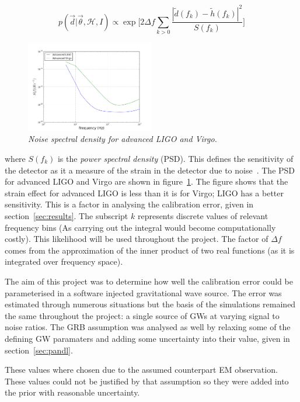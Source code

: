 \documentclass[12pt]{iopart}
\newcommand{\curlH}{\mathcal{H}}
\begin{document}
\begin{equation}
  p(\vec{d} | \vec{\theta}, \curlH, I) \propto \exp\Bigg[ 2\Delta
f\sum_{k>0}\frac{|\tilde{d}(f_{k}) - \tilde{h}(f_{k})|^{2}}{S(f_{k})} \Bigg]
\end{equation}

\begin{figure}
  \centering
  \includegraphics[width=0.5\textwidth]{PSD}
  \caption{\textit{Noise spectral density for advanced LIGO and Virgo.}}
  \label{fig:psd}
\end{figure}

where $S(f_{k})$ is the \textit{power spectral density} (PSD). This defines the
sensitivity of the detector as it a measure of the strain in the detector due
to noise~\cite{SathSchutz,sens}. The PSD for advanced LIGO and Virgo are shown
in figure~\ref{fig:psd}. The figure shows that the strain effect for advanced
LIGO is less than it is for Virgo; LIGO has a better sensitivity. This is a
factor in analysing the calibration error, given in section~\ref{sec:results}.
The subscript $k$ represents discrete values of relevant frequency bins (As
carrying out the integral would become computationally costly). This likelihood
will be used throughout the project. The factor of $\Delta f$ comes from the
approximation of the inner product of two real functions (as it is integrated
over frequency space).

The aim of this project was to determine how well the calibration error could
be parameterised in a software injected gravitational wave source. The error
was estimated through numerous situations but the basis of the simulations
remained the same throughout the project: a single source of GWs at varying
signal to noise ratios. The GRB assumption was analysed as well by relaxing
some of the defining GW paramaters and adding some uncertainty into their
value, given in section~\ref{sec:pandl}.


These values where chosen due to the assumed counterpart EM observation. These
values could not be justified by that assumption so they were added into the
prior with reasonable uncertainty.
\end{document}
